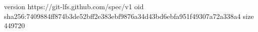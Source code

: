 version https://git-lfs.github.com/spec/v1
oid sha256:7409884ff874b3de52bff2e383ebf9876a34d43bd6ebfa951f49307a72a338a4
size 449720
